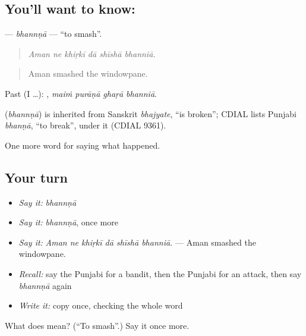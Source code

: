 \subsection*{You'll want to know: }
\textbf{} — \emph{bhannṇā} — \textquotedblleft{}to smash\textquotedblright{}.

\begin{quote}
     
\end{quote}

\begin{quote}
\emph{Aman ne khiṛkī dā shīshā bhanniā.}
\end{quote}

\begin{quote}
Aman smashed the windowpane.
\end{quote}

Past (I …):    , \emph{maiṁ purāṇā ghaṛā bhanniā}.

\begin{cousinweb}
\textbf{} (\emph{bhannṇā}) is inherited from Sanskrit \emph{bhajyate}, \textquotedblleft{}is broken\textquotedblright{}; CDIAL lists Punjabi \emph{bhanṇā}, \textquotedblleft{}to break\textquotedblright{}, under it (CDIAL 9361).
\end{cousinweb}

\begin{grammarlens}[title={What you've built}]
One more word for saying what happened.
\end{grammarlens}

\subsection*{Your turn}
\begin{itemize}
\raggedright
  \item \emph{Say it:} \emph{bhannṇā}
  \item \emph{Say it:} \emph{bhannṇā}, once more
  \item \emph{Say it:} \emph{Aman ne khiṛkī dā shīshā bhanniā.} — Aman smashed the windowpane.
  \item \emph{Recall:} say the Punjabi for a bandit, then the Punjabi for an attack, then say \emph{bhannṇā} again
  \item \emph{Write it:} copy \textbf{} once, checking the whole word
\end{itemize}

\begin{tcolorbox}[breakable,colback=teal!4,colframe=teal!35!black,title={Before you move on}]
What does  mean? (\textquotedblleft{}To smash\textquotedblright{}.) Say it once more.
\end{tcolorbox}
